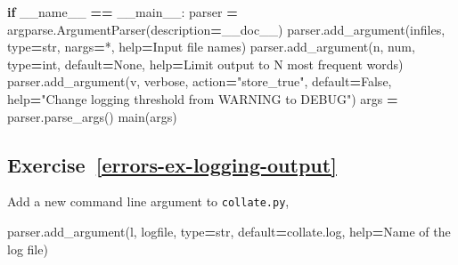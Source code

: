 \documentclass[
]{krantz}
\makeatletter
\newenvironment{Shaded}{\begin{snugshade}}{\end{snugshade}}
\newcommand{\BuiltInTok}[1]{#1}
\newcommand{\ControlFlowTok}[1]{\textcolor[rgb]{0.13,0.29,0.53}{\textbf{#1}}}
\newcommand{\NormalTok}[1]{#1}
\newcommand{\OperatorTok}[1]{\textcolor[rgb]{0.81,0.36,0.00}{\textbf{#1}}}
\newcommand{\StringTok}[1]{\textcolor[rgb]{0.31,0.60,0.02}{#1}}
\newcommand{\VariableTok}[1]{\textcolor[rgb]{0.00,0.00,0.00}{#1}}
\newenvironment{kframe}{%
\medskip{}
\setlength{\fboxsep}{.8em}
 \def\at@end@of@kframe{}%
 \ifinner\ifhmode%
  \def\at@end@of@kframe{\end{minipage}}%
  \begin{minipage}{\columnwidth}%
 \fi\fi%
 \def\FrameCommand##1{\hskip\@totalleftmargin \hskip-\fboxsep
 \colorbox{shadecolor}{##1}\hskip-\fboxsep
     \hskip-\linewidth \hskip-\@totalleftmargin \hskip\columnwidth}%
 \MakeFramed {\advance\hsize-\width
   \@totalleftmargin\z@ \linewidth\hsize
   \@setminipage}}%
 {\par\unskip\endMakeFramed%
 \at@end@of@kframe}
\renewenvironment{Shaded}{\begin{kframe}}{\end{kframe}}
\makeatother
\begin{document}
\begin{Shaded}
\begin{Highlighting}[]
\ControlFlowTok{if} \VariableTok{\_\_name\_\_} \OperatorTok{==} \StringTok{\textquotesingle{}\_\_main\_\_\textquotesingle{}}\NormalTok{:}
\NormalTok{    parser }\OperatorTok{=}\NormalTok{ argparse.ArgumentParser(description}\OperatorTok{=}\NormalTok{\_\_doc\_\_)}
\NormalTok{    parser.add\_argument(}\StringTok{\textquotesingle{}infiles\textquotesingle{}}\NormalTok{, }\BuiltInTok{type}\OperatorTok{=}\BuiltInTok{str}\NormalTok{, nargs}\OperatorTok{=}\StringTok{\textquotesingle{}*\textquotesingle{}}\NormalTok{, }\BuiltInTok{help}\OperatorTok{=}\StringTok{\textquotesingle{}Input file names\textquotesingle{}}\NormalTok{)}
\NormalTok{    parser.add\_argument(}\StringTok{\textquotesingle{}{-}n\textquotesingle{}}\NormalTok{, }\StringTok{\textquotesingle{}{-}{-}num\textquotesingle{}}\NormalTok{, }\BuiltInTok{type}\OperatorTok{=}\BuiltInTok{int}\NormalTok{, default}\OperatorTok{=}\VariableTok{None}\NormalTok{,}
                        \BuiltInTok{help}\OperatorTok{=}\StringTok{\textquotesingle{}Limit output to N most frequent words\textquotesingle{}}\NormalTok{)}
\NormalTok{    parser.add\_argument(}\StringTok{\textquotesingle{}{-}v\textquotesingle{}}\NormalTok{, }\StringTok{\textquotesingle{}{-}{-}verbose\textquotesingle{}}\NormalTok{, action}\OperatorTok{=}\StringTok{"store\_true"}\NormalTok{, default}\OperatorTok{=}\VariableTok{False}\NormalTok{,}
                        \BuiltInTok{help}\OperatorTok{=}\StringTok{"Change logging threshold from WARNING to DEBUG"}\NormalTok{)}
\NormalTok{    args }\OperatorTok{=}\NormalTok{ parser.parse\_args()}
\NormalTok{    main(args)}
\end{Highlighting}
\end{Shaded}

\hypertarget{exercise-referrors-ex-logging-output}{%
\subsection*{Exercise~\ref{errors-ex-logging-output}}\label{exercise-referrors-ex-logging-output}}


Add a new command line argument to \texttt{collate.py},

\begin{Shaded}
\begin{Highlighting}[]
\NormalTok{parser.add\_argument(}\StringTok{\textquotesingle{}{-}l\textquotesingle{}}\NormalTok{, }\StringTok{\textquotesingle{}{-}{-}logfile\textquotesingle{}}\NormalTok{, }\BuiltInTok{type}\OperatorTok{=}\BuiltInTok{str}\NormalTok{, default}\OperatorTok{=}\StringTok{\textquotesingle{}collate.log\textquotesingle{}}\NormalTok{,}
                    \BuiltInTok{help}\OperatorTok{=}\StringTok{\textquotesingle{}Name of the log file\textquotesingle{}}\NormalTok{)}
\end{Highlighting}
\end{Shaded}
\end{document}
